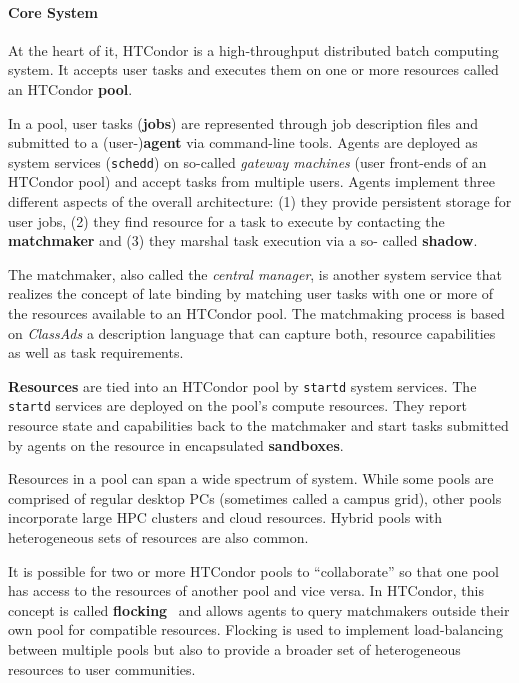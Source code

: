 \documentclass{sig-alternate}
\begin{document}
\paragraph{Core System}

At the heart of it, HTCondor is a high-throughput distributed batch computing
system.
It accepts user tasks and executes them on one or more resources called an
HTCondor \textbf{pool}.

In a pool, user tasks (\textbf{jobs}) are represented through job description
files and submitted to a (user-)\textbf{agent} via command-line tools. Agents
are deployed as system services (\texttt{schedd}) on so-called \textit{gateway
machines} (user front-ends of an HTCondor pool) and accept tasks from multiple
users. Agents implement three different aspects of the overall architecture:
(1) they provide persistent storage for user jobs, (2) they find resource for
a task to execute by contacting the \textbf{matchmaker} and (3) they marshal
task execution via a so- called \textbf{shadow}.

The matchmaker, also called the \textit{central manager}, is another system
service that realizes the concept of late binding by matching user tasks with
one or more of the resources available to an HTCondor pool. The matchmaking
process is based on \textit{ClassAds} a description language that can capture
both, resource capabilities as well as task requirements.

\textbf{Resources} are tied into an HTCondor pool by \texttt{startd} system
services.
The \texttt{startd} services are deployed on the pool's compute resources.
They report resource state and  capabilities back to the matchmaker and start
tasks submitted by agents on the resource in encapsulated \textbf{sandboxes}.

Resources in a pool can span a wide spectrum of system. While some pools are
comprised of regular desktop PCs (sometimes called a campus grid), other pools
incorporate large HPC clusters and cloud resources.
Hybrid pools with heterogeneous sets of resources are also common.

It is possible for two or more HTCondor pools to ``collaborate'' so that one
pool has access to the resources of another pool and vice versa.
In HTCondor, this concept is called
\textbf{flocking}~\cite{Epema:1996:flocking} and allows agents to query
matchmakers outside their own pool for compatible resources.
Flocking is used to implement load-balancing between multiple pools but also to
provide a broader set of heterogeneous resources to user communities.
\end{document}
